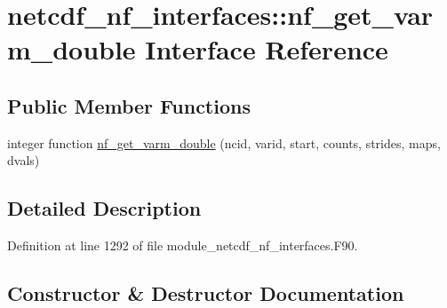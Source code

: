 \hypertarget{interfacenetcdf__nf__interfaces_1_1nf__get__varm__double}{}\section{netcdf\+\_\+nf\+\_\+interfaces\+:\+:nf\+\_\+get\+\_\+varm\+\_\+double Interface Reference}
\label{interfacenetcdf__nf__interfaces_1_1nf__get__varm__double}
\subsection*{Public Member Functions}
\begin{DoxyCompactItemize}
\item 
integer function \hyperlink{interfacenetcdf__nf__interfaces_1_1nf__get__varm__double_aafa950a87085eb4b8fe6de3a6a0cd3e6}{nf\+\_\+get\+\_\+varm\+\_\+double} (ncid, varid, start, counts, strides, maps, dvals)
\end{DoxyCompactItemize}


\subsection{Detailed Description}


Definition at line 1292 of file module\+\_\+netcdf\+\_\+nf\+\_\+interfaces.\+F90.



\subsection{Constructor \& Destructor Documentation}
\mbox{\label{interfacenetcdf__nf__interfaces_1_1nf__get__varm__double_aafa950a87085eb4b8fe6de3a6a0cd3e6}} 
